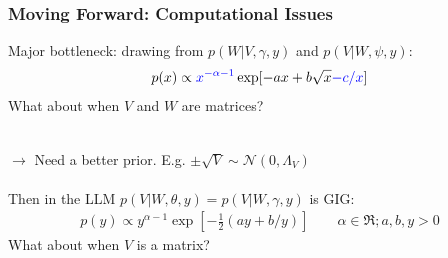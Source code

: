 \documentclass[xcolor=dvipsnames]{beamer}
\newcommand\N{\mathcal{N}}
\begin{document}
%

\begin{frame}
\frametitle{Moving Forward: Computational Issues}
Major bottleneck: drawing from $p(W|V,\gamma,y)$ and $p(V|W,\psi,y)$:
\begin{align*}
p(x)\propto {\color{blue}x^{-\alpha-1}}\exp[-ax + b\sqrt{x} {\color{blue}- c/x}] 
\end{align*}
What about when $V$ and $W$ are matrices?\\~

$\to$ Need a better prior. E.g. $\pm \sqrt{V} \sim \N(0,\Lambda_V)$\\~\\

Then in the LLM $p(V|W,\theta,y)=p(V|W,\gamma,y)$ is GIG:
\begin{align*}
p(y) \propto y^{\alpha-1}\exp\left[-\frac{1}{2}(ay + b/y)\right] \qquad \alpha\in\Re; a,b,y>0
\end{align*}
What about when $V$ is a matrix?
\end{frame}
\end{document}
